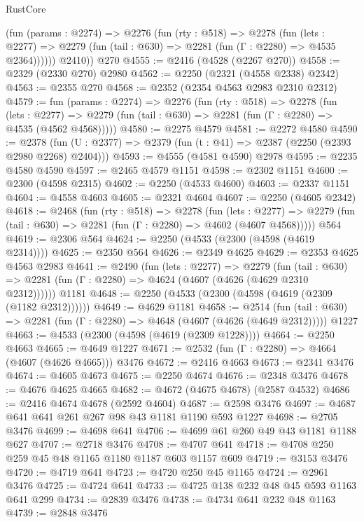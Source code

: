 \begin{lexlean}{RustCore}
\begin{coremodule}
          (fun (params : @2274) =>
          @2276
            (fun (rty : @518) =>
            @2278
              (fun (lets : @2277) =>
              @2279 (fun (tail : @630) => @2281 (fun (Γ : @2280) => @4535 @2364))))))
        @2410))
    @270
@4555 := @2416 (@4528 (@2267 @270))
@4558 := @2329 (@2330 @270) @2980
@4562 := @2250 (@2321 (@4558 @2338) @2342)
@4563 := @2355 @270
@4568 := @2352 (@2354 @4563 @2983 @2310 @2312)
@4579 := fun (params : @2274) =>
  @2276
    (fun (rty : @518) =>
    @2278
      (fun (lets : @2277) =>
      @2279 (fun (tail : @630) => @2281 (fun (Γ : @2280) => @4535 (@4562 @4568)))))
@4580 := @2275 @4579
@4581 := @2272 @4580
@4590 := @2378 (fun (U : @2377) => @2379 (fun (t : @41) => @2387 (@2250 (@2393 @2980 @2268) @2404)))
@4593 := @4555 (@4581 @4590) @2978
@4595 := @2235 @4580 @4590
@4597 := @2465 @4579 @1151
@4598 := @2302 @1151
@4600 := @2300 (@4598 @2315)
@4602 := @2250 (@4533 @4600)
@4603 := @2337 @1151
@4604 := @4558 @4603
@4605 := @2321 @4604
@4607 := @2250 (@4605 @2342)
@4618 := @2468
    (fun (rty : @518) =>
    @2278
      (fun (lets : @2277) =>
      @2279 (fun (tail : @630) => @2281 (fun (Γ : @2280) => @4602 (@4607 @4568)))))
    @564
@4619 := @2306 @564
@4624 := @2250 (@4533 (@2300 (@4598 (@4619 @2314))))
@4625 := @2350 @564
@4626 := @2349 @4625
@4629 := @2353 @4625 @4563 @2983
@4641 := @2490
    (fun (lets : @2277) =>
    @2279
      (fun (tail : @630) => @2281 (fun (Γ : @2280) => @4624 (@4607 (@4626 (@4629 @2310 @2312))))))
    @1181
@4648 := @2250 (@4533 (@2300 (@4598 (@4619 (@2309 (@1182 @2312))))))
@4649 := @4629 @1181
@4658 := @2514
    (fun (tail : @630) => @2281 (fun (Γ : @2280) => @4648 (@4607 (@4626 (@4649 @2312)))))
    @1227
@4663 := @4533 (@2300 (@4598 (@4619 (@2309 @1228))))
@4664 := @2250 @4663
@4665 := @4649 @1227
@4671 := @2532 (fun (Γ : @2280) => @4664 (@4607 (@4626 @4665))) @3476
@4672 := @2416 @4663
@4673 := @2341 @3476
@4674 := @4605 @4673
@4675 := @2250 @4674
@4676 := @2348 @3476
@4678 := @4676 @4625 @4665
@4682 := @4672 (@4675 @4678) (@2587 @4532)
@4686 := @2416 @4674 @4678 (@2592 @4604)
@4687 := @2598 @3476
@4697 := @4687 @641 @641 @261 @267 @98 @43 @1181 @1190 @593 @1227
@4698 := @2705 @3476
@4699 := @4698 @641
@4706 := @4699 @61 @260 @49 @43 @1181 @1188 @627
@4707 := @2718 @3476
@4708 := @4707 @641
@4718 := @4708 @250 @259 @45 @48 @1165 @1180 @1187 @603 @1157 @609
@4719 := @3153 @3476
@4720 := @4719 @641
@4723 := @4720 @250 @45 @1165
@4724 := @2961 @3476
@4725 := @4724 @641
@4733 := @4725 @138 @232 @48 @45 @593 @1163 @641 @299
@4734 := @2839 @3476
@4738 := @4734 @641 @232 @48 @1163
@4739 := @2848 @3476

\end{coremodule}
\end{lexlean}
